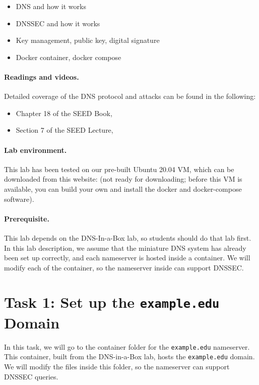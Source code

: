 \begin{itemize}[noitemsep]
\item DNS and how it works
\item DNSSEC and how it works
\item Key management, public key, digital signature 
\item Docker container, docker compose
\end{itemize}


\paragraph{Readings and videos.}
Detailed coverage of the DNS protocol and attacks can be found in the following:

\begin{itemize}
\item Chapter 18 of the SEED Book, \seedbook
\item Section 7 of the SEED Lecture, \seedisvideo
\end{itemize}


\paragraph{Lab environment.} This lab has been tested on our pre-built
Ubuntu 20.04 VM, which can be downloaded
from this website: (not ready for downloading; before this VM is available,
you can build your own and install the docker and docker-compose software).



\paragraph{Prerequisite.} This lab depends on the DNS-In-a-Box lab, 
so students should do that lab first. In this lab description,
we assume that the miniature DNS system has already been set up
correctly, and each nameserver is hosted inside a container. 
We will modify each of the container, so the nameserver inside 
can support DNSSEC.



\section{Task 1: Set up the \texttt{example.edu} Domain}


In this task, we will go to the container folder for the 
\texttt{example.edu} nameserver. This container, built 
from the DNS-in-a-Box lab, hosts 
the \texttt{example.edu} domain. 
We will modify the files inside this folder, so the nameserver
can support DNSSEC queries.


